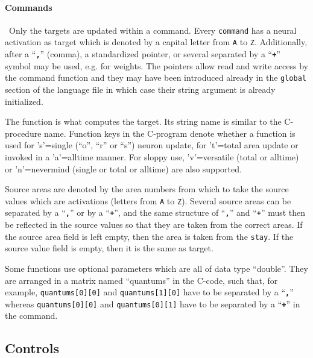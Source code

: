 \documentclass[12pt]{article}
\begin{document}
\paragraph{Commands} $\,\!$
Only the {\color{blue} target}s are updated within a command.
Every \texttt{command} has a neural activation as target which is denoted by a capital letter from \texttt{A} to \texttt{Z}.
Additionally, after a ``\texttt{\bf ,}'' (comma), a standardized pointer, or several separated by a  ``{\bf \texttt{+}}'' symbol may be used, e.g. for weights.
The pointers allow read and write access by the command function
and they may have been introduced already in the \texttt{global} section of the language file in which case their string argument is already initialized.

The {\color{blue} function} is what computes the target. Its string name is similar to the C-procedure name.
Function keys in the C-program denote whether a function is used for 's'=single (``o'', ``r'' or ``s'') neuron update, for 't'=total area update or invoked in a 'a'=alltime manner.
For sloppy use, 'v'=versatile (total or alltime) or 'n'=nevermind (single or total or alltime) are also supported.

{\color{blue} Source areas} are denoted by the area numbers from which to take the {\color{blue} source values} which are activations (letters from \texttt{A} to \texttt{Z}).
Several {\color{blue} source areas} can be separated by a ``{\bf \texttt{,}}'' or by a ``{\bf \texttt{+}}'',
and the same structure of ``{\bf \texttt{,}}'' and ``{\bf \texttt{+}}'' must then be reflected in the {\color{blue} source values} so that they are taken from the correct areas.
If the {\color{blue} source area} field is left empty, then the area is taken from the \texttt{stay}.
If the {\color{blue} source value} field is empty, then it is the same as {\color{blue} target}.

Some functions use {\color{blue} optional parameters} which are all of data type ``double''.
They are arranged in a matrix named ``quantums'' in the C-code,
such that, for example, \texttt{quantums[0][0]} and \texttt{quantums[1][0]} have to be separated by a ``{\bf \texttt{,}}''
whereas \texttt{quantums[0][0]} and \texttt{quantums[0][1]} have to be separated by a ``{\bf \texttt{+}}'' in the command.


\subsection{Controls}
\end{document}
